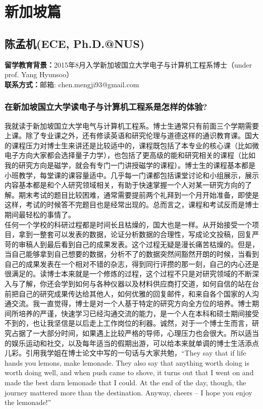 \documentclass[a4paper,UTF8]{book}
\begin{document}
\clearpage
\section{新加坡篇}

\subsection{陈孟机(ECE, Ph.D.@NUS)}
    \textbf{留学教育背景：}2015年8月入学新加坡国立大学电子与计算机工程系博士（under prof. Yang Hyunsoo）\\
    \textbf{联系方式：}邮箱: chen.mengji93@gmail.com

    \subsubsection*{在新加坡国立大学读电子与计算机工程系是怎样的体验?}
    我就读于新加坡国立大学电气与计算机工程系。博士生通常只有前面三个学期需要上课。除了专业课之外，还有修读英语和研究伦理与道德这样的通识教育课。国大的课程压力对博士生来讲还是比较适中的，课程既包括了本专业的核心课（比如微电子方向大家都会选择量子力学），也包括了更高级的能和研究相关的课程（比如我的研究方向是磁学，就会有专门一门讲授磁学的课程）。博士生的课程基本都是小班教学，每堂课的课容量适中。几乎每一门课都包括课堂讨论和小组展示，展示内容基本都是和个人研究领域相关，有助于快速掌握一个人对某一研究方向的了解。期末考试的题目比较困难，通常需要提前两个礼拜到一个月开始准备，即使是这样，考试的时候答不完题目也是经常出现的。总而言之，课程和考试反而是博士期间最轻松的事情了。\\
    任何一个学校的科研过程都是时间长且枯燥的，国大也是一样。从开始接受一个项目，拿到一整套可以发表的数据，论证分析数据的合理性，写成论文投稿，回复严苛的审稿人到最后看到自己的成果发表。这个过程无疑是漫长痛苦枯燥的。但是，当自己能够拿到自己想要的数据，分析不了的数据突然间豁然开朗的时候，当看到自己的成果发表在一个相对不错的杂志，得到同行评攒的那一刻，自己的内心还是很满足的。读博士本来就是一个修炼的过程，这个过程不只是对研究领域的不断深入与了解，你还会学到如何与各种仪器以及材料供应商打交道，如何自信的站在台前把自己的研究成果传达给其他人，如何优雅的回复邮件，和来自各个国家的人沟通交流。我一直觉得，博士是对一个人基于特定的研究方向全方位的培养。博士期间所培养的严谨，快速学习已经沟通交流的能力，是一个人在本科和硕士期间接受不到的，也让我坚信是以后走上工作岗位的利器。诚然，对于一个博士生而言，研究占据了一大部分时间，如果遇上比较严格的导师，心理压力也会很大。所以适当的娱乐运动和社交，以及每年适当的假期出游，可以给本来就单调的博士生活添点儿彩。引用我学姐在博士论文中写的一句话与大家共勉，“They say that if life hands you lemons, make lemonade. They also say that anything worth doing is worth doing well, and when push came to shove, it turns out that I went on and made the best darn lemonade that I could. At the end of the day, though, the journey mattered more than the destination. Anyway, cheers – I hope you enjoy the lemonade!” 
\end{document}
